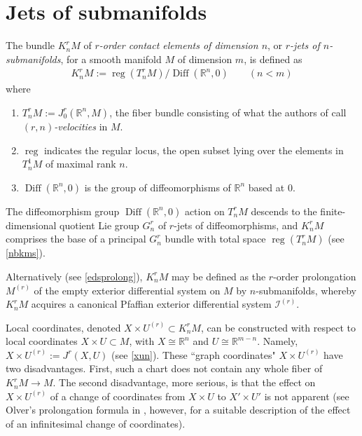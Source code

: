 \documentclass[12pt]{article}
\numberwithin{equation}{section}
\theoremstyle{plain}
\theoremstyle{definition}
\newcommand{\R}{\mathbb{R}}
\newcommand{\RP}{\mathbb{RP}}
\newcommand{\ra}{\rightarrow}
\begin{document}

\section{Jets of submanifolds}\label{curvejetssec}

The bundle $K^{r}_{n}M$ of \emph{$r$-order contact elements of dimension $n$}, or \emph{$r$-jets of $n$-submanifolds}, for a smooth manifold $M$ of dimension $m$, is defined as
\begin{align*}
K^{r}_{n}M:=\operatorname{reg}(T^{r}_{n}M)/\operatorname{Diff}(\R^{n},0)\qquad (n< m)
\end{align*}
where
\begin{enumerate}
\itemsep0em
\item{$T^{r}_{n}M:=J^{r}_{0}(\R^{n},M)$, the fiber bundle consisting of what the authors of \cite{kms} call \emph{$(r,n)$-velocities} in $M$.}
\item{$\operatorname{reg}$ indicates the regular locus, the open subset lying over the elements in $T^{1}_{n}M$ of maximal rank $n$.}
\item{$\operatorname{Diff}(\R^{n},0)$ is the group of diffeomorphisms of $\R^{n}$ based at $0$.}
\end{enumerate}
The diffeomorphism group $\operatorname{Diff}(\R^{n},0)$ action on $T^{r}_{n}M$ descends to the finite-dimensional quotient Lie group $G^{r}_{n}$ of $r$-jets of diffeomorphisms, and $K^{r}_{n}M$ comprises the base of a principal $G^{r}_{n}$ bundle with total space $\operatorname{reg}(T^{r}_{n}M)$ (see \ref{nbkms}).

Alternatively (see \ref{edsprolong}), $K^{r}_{n}M$ may be defined as the $r$-order prolongation $M^{(r)}$ of the empty exterior differential system on $M$ by $n$-submanifolds, whereby $K^{r}_{n}M$ acquires a canonical Pfaffian exterior differential system $\mathcal{I}^{(r)}$.

Local coordinates, denoted $X\times U^{(r)}\subset K^{r}_{n}M$, can be constructed with respect to local coordinates $X\times U \subset M$, with $X\cong \R^{n}$ and $U\cong \R^{m-n}$. Namely, $X\times U^{(r)}:=J^{r}(X,U)$ (see \ref{xun}). These ``graph coordinates" $X\times U^{(r)}$ have two disadvantages. First, such a chart does not contain any whole fiber of $K^{r}_{n}M\ra M$. The second disadvantage, more serious, is that the effect on $X\times U^{(r)}$ of a change of coordinates from $X\times U$ to $X'\times U'$  is not apparent (see Olver's prolongation formula in \cite{olver}, however, for a suitable description of the effect of an infinitesimal change of coordinates).
\end{document}
